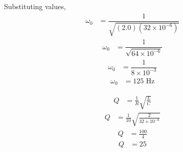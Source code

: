 \documentclass[journal,12pt,twocolumn]{IEEEtran}
\theoremstyle{remark}
\begin{document}
Substituting values,
\begin{align}
\omega_0 &= \dfrac{1}{\sqrt{(2.0)(32 \times 10^{-6})}}
\end{align}
\begin{align}
\omega_0 &= \dfrac{1}{\sqrt{64 \times 10^{-6}}}
\end{align}
\begin{align}
\omega_0 &= \dfrac{1}{8 \times 10^{-3}}
\end{align}
\begin{align}
\omega_0 &= 125 \text{ Hz}
\end{align}

\begin{align}
Q &= \frac{1}{R}\sqrt{\frac{L}{C}}
\end{align}
\begin{align}
Q &= \frac{1}{10}\sqrt{\frac{2}{32 \times 10^{-6}}}
\end{align}
\begin{align}
Q &= \frac{100}{4}
\end{align}
\begin{align}
Q &= 25
\end{align}
\end{document}
